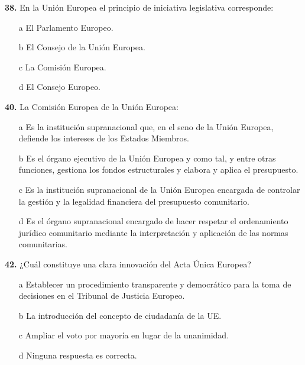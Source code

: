 \documentclass{nuevotema}
\begin{document}

\textbf{38.} En la Unión Europea el principio de iniciativa legislativa corresponde:

\begin{enumerate}
	\item[a] El Parlamento Europeo.
	\item[b] El Consejo de la Unión Europea.
	\item[c] La Comisión Europea.
	\item[d] El Consejo Europeo.
\end{enumerate}


\textbf{40.} La Comisión Europea de la Unión Europea:

\begin{enumerate}
	\item[a] Es la institución supranacional que, en el seno de la Unión Europea, defiende los intereses de los Estados Miembros.
	\item[b] Es el órgano ejecutivo de la Unión Europea y como tal, y entre otras funciones, gestiona los fondos estructurales y elabora y aplica el presupuesto.
	\item[c] Es la institución supranacional de la Unión Europea encargada de controlar la gestión y la legalidad financiera del presupuesto comunitario.
	\item[d] Es el órgano supranacional encargado de hacer respetar el ordenamiento jurídico comunitario mediante la interpretación y aplicación de las normas comunitarias.
\end{enumerate}


\textbf{42.} ¿Cuál constituye una clara innovación del Acta Única Europea?
\begin{enumerate}
	\item[a] Establecer un procedimiento transparente y democrático para la toma de decisiones en el Tribunal de Justicia Europeo.
	\item[b] La introducción del concepto de ciudadanía de la UE.
	\item[c] Ampliar el voto por mayoría en lugar de la unanimidad.
	\item[d] Ninguna respuesta es correcta.
\end{enumerate}
\end{document}
